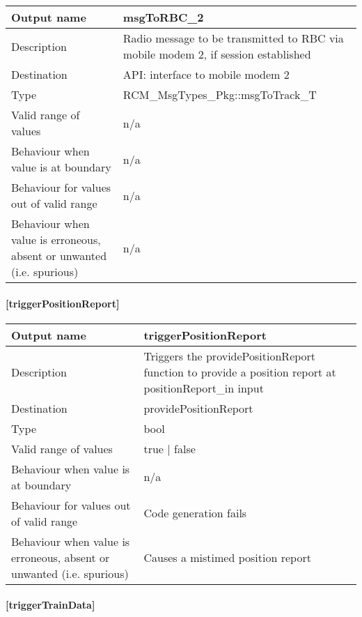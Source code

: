 \begin{longtable}{p{}p{}}
	\toprule
	Output name				& msgToRBC\_2 \\
	\midrule
	Description				& Radio message to be transmitted to RBC via mobile modem 2, if session established \\
	\midrule
	Destination				& API: interface to mobile modem 2 \\ 
	\midrule
	Type					& RCM\_MsgTypes\_Pkg::msgToTrack\_T \\
	\midrule
	Valid range of values	& n/a \\
	\midrule
	Behaviour when value is at boundary	& n/a \\
	\midrule
	Behaviour for values out of valid range	& n/a \\
	\midrule
	Behaviour when value is erroneous, absent or unwanted (i.e. spurious) & n/a \\
	\bottomrule
\end{longtable}

\paragraph{[triggerPositionReport]}

\begin{longtable}{p{}p{}}
	\toprule
	Output name				& triggerPositionReport \\
	\midrule
	Description				& Triggers the providePositionReport function to provide a position report at positionReport\_in input \\
	\midrule
	Destination				& providePositionReport \\ 
	\midrule
	Type					& bool \\
	\midrule
	Valid range of values	& true | false \\
	\midrule
	Behaviour when value is at boundary	& n/a \\
	\midrule
	Behaviour for values out of valid range	& Code generation fails \\
	\midrule
	Behaviour when value is erroneous, absent or unwanted (i.e. spurious) & Causes a mistimed position report  \\
	\bottomrule
\end{longtable}


\paragraph{[triggerTrainData]}

